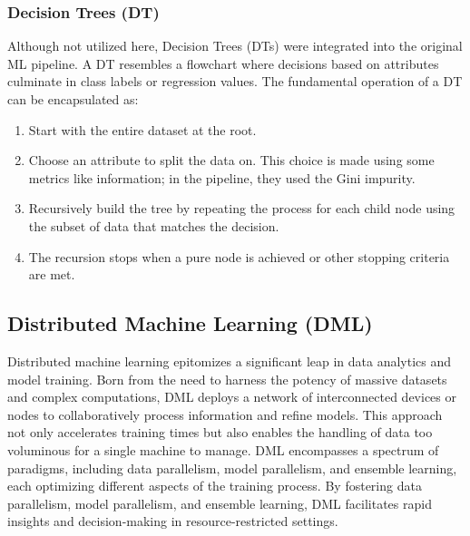 \subsubsection{Decision Trees (DT)}
Although not utilized here, Decision Trees (DTs) were integrated into the original ML pipeline. A DT resembles a flowchart where decisions based on attributes culminate in class labels or regression values\cite{ML_paper}. The fundamental operation of a DT can be encapsulated as:
\begin{enumerate}
    \item Start with the entire dataset at the root.
    \item Choose an attribute to split the data on. This choice is made using some metrics like information; in the pipeline, they used the Gini impurity.
    \item Recursively build the tree by repeating the process for each child node using the subset of data that matches the decision.
    \item The recursion stops when a pure node is achieved or other stopping criteria are met.
\end{enumerate}



\subsection{Distributed Machine Learning (DML)}
\label{DML}
Distributed machine learning epitomizes a significant leap in data analytics and model training. Born from the need to harness the potency of massive datasets and complex computations, DML deploys a network of interconnected devices or nodes to collaboratively process information and refine models. This approach not only accelerates training times but also enables the handling of data too voluminous for a single machine to manage. DML encompasses a spectrum of paradigms, including data parallelism, model parallelism, and ensemble learning, each optimizing different aspects of the training process\cite{DML_paper}. By fostering data parallelism, model parallelism, and ensemble learning, DML facilitates rapid insights and decision-making in resource-restricted settings.

